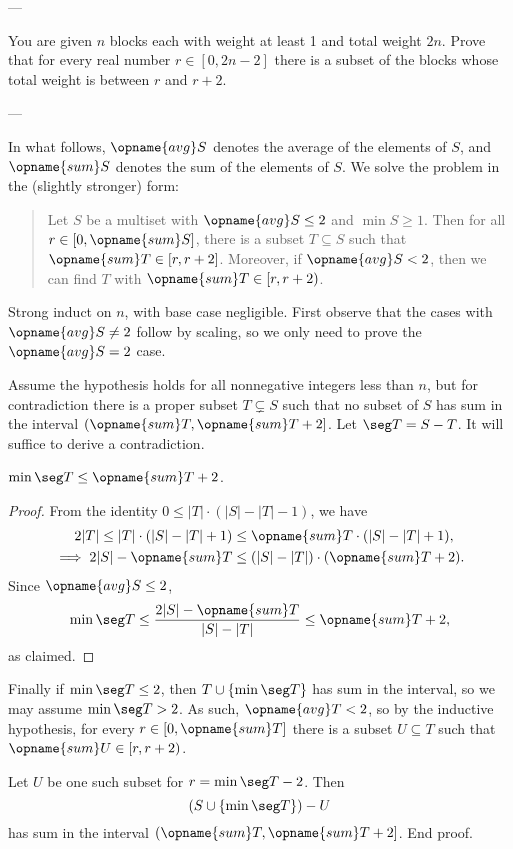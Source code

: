 
---

You are given $n$ blocks each with weight at least 1 and total weight $2n$. Prove that for every real number $r\in[0,2n-2]$ there is a subset of the blocks whose total weight is between $r$ and $r+2$.

---

In what follows, $\opname{avg}S$ denotes the average of the elements of $S$, and $\opname{sum}S$ denotes the sum of the elements of $S$. We solve the problem in the (slightly stronger) form:
\begin{quote}
    Let $S$ be a multiset with $\opname{avg}S\le2$ and $\min S\ge1$. Then for all $r\in[0,\opname{sum}S]$, there is a subset $T\subseteq S$ such that $\opname{sum}T\in[r,r+2]$. Moreover, if $\opname{avg}S<2$, then we can find $T$ with $\opname{sum}T\in[r,r+2)$.
\end{quote}
Strong induct on $n$, with base case negligible.
First observe that the cases with $\opname{avg}S\ne2$ follow by scaling, so we only need to prove the $\opname{avg}S=2$ case.

Assume the hypothesis holds for all nonnegative integers less than $n$, but for contradiction there is a proper subset $T\subsetneq S$ such that no subset of $S$ has sum in the interval $(\opname{sum}T,\opname{sum}T+2]$. Let $\seg T=S-T$. It will suffice to derive a contradiction.
\begin{claim*}
    $\min\seg T\le\opname{sum}T+2$.
\end{claim*}
\begin{proof}
    From the identity $0\le|T|\cdot(|S|-|T|-1)$, we have
    \begin{align*}
    2|T|\le|T|\cdot(|S|-|T|+1)&\le\opname{sum}T\cdot(|S|-|T|+1),\\
    \implies2|S|-\opname{sum}T&\le(|S|-|T|)\cdot(\opname{sum}T+2).
    \end{align*}
    Since $\opname{avg}S\le2$,
    \[\min\seg T\le\frac{2|S|-\opname{sum}T}{|S|-|T|}\le\opname{sum}T+2,\]
    as claimed.
\end{proof}

Finally if $\min\seg T\le2$, then $T\cup\{\min\seg T\}$ has sum in the interval, so we may assume $\min\seg T>2$. As such, $\opname{avg}T<2$, so by the inductive hypothesis, for every $r\in[0,\opname{sum}T]$ there is a subset $U\subseteq T$ such that $\opname{sum}U\in[r,r+2)$.

Let $U$ be one such subset for $r=\min\seg T-2$. Then
\[\left(S\cup\{\min\seg T\}\right)-U\]
has sum in the interval $(\opname{sum}T,\opname{sum}T+2]$. End proof.

